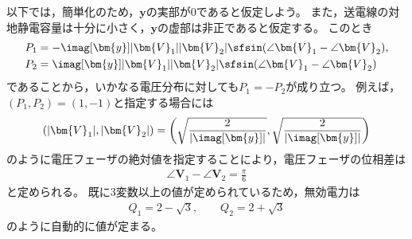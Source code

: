 \documentclass[tombow,dvipdfmx]{corona-a5}
\begin{document}
\begin{例}[2つのバスで構成される電力系統モデルの潮流計算]
以下では，簡単化のため，$\bm{y}$の実部が0であると仮定しよう。
また，送電線の対地静電容量は十分に小さく，$\bm{y}$の虚部は非正であると仮定する。
このとき
\begin{align*}
P_1 &= -\imag[\bm{y}]  |\bm{V}_1| |\bm{V}_2| \sfsin (\angle \bm{V}_1- \angle \bm{V}_2), \\
P_2 & =   \imag[\bm{y}] |\bm{V}_1| |\bm{V}_2| \sfsin (\angle \bm{V}_1- \angle \bm{V}_2)
\end{align*}
であることから，いかなる電圧分布に対しても$P_1 = -P_2$が成り立つ。
例えば，$(P_1,P_2)=(1,-1)$と指定する場合には
\begin{align*}\textstyle
\left(
|\bm{V}_1|, |\bm{V}_2| 
\right)
=
\left(
\sqrt{
\frac{2}{|\imag[\bm{y}]|}
}, 
\sqrt{
\frac{2}{|\imag[\bm{y}]|}
}
\right)
\end{align*}
のように電圧フェーザの絶対値を指定することにより，電圧フェーザの位相差は
\begin{align*}
\angle \bm{V}_1- \angle \bm{V}_2 = \frac{\pi}{6}
\end{align*}
と定められる。
既に3変数以上の値が定められているため，無効電力は
\begin{align*}
Q_1 = 2 -\sqrt{3},\qquad
Q_2 = 2 +\sqrt{3}
\end{align*}
のように自動的に値が定まる。
\end{例}
\end{document}
